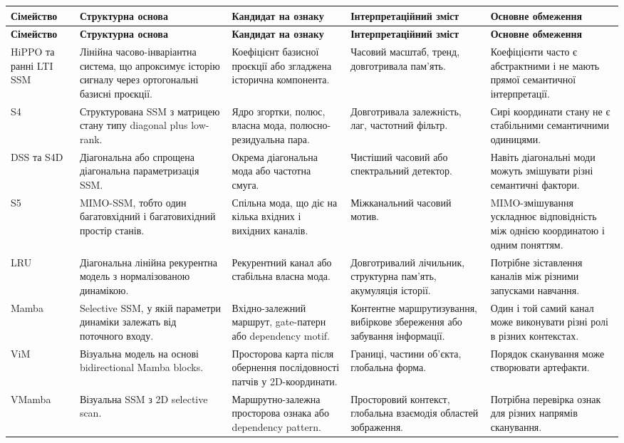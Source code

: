 \documentclass[12pt,a4paper]{article}
\begin{document}
\begin{longtable}{p{2.6cm} p{3.6cm} p{3.4cm} p{3.2cm} p{3.4cm}}
\toprule
\textbf{Сімейство}
&
\textbf{Структурна основа}
&
\textbf{Кандидат на ознаку}
&
\textbf{Інтерпретаційний зміст}
&
\textbf{Основне обмеження}
\\
\midrule
\endfirsthead

\toprule
\textbf{Сімейство}
&
\textbf{Структурна основа}
&
\textbf{Кандидат на ознаку}
&
\textbf{Інтерпретаційний зміст}
&
\textbf{Основне обмеження}
\\
\midrule
\endhead

HiPPO та ранні LTI SSM
&
Лінійна часово-інваріантна система, що апроксимує історію сигналу
через ортогональні базисні проєкції.
&
Коефіцієнт базисної проєкції або згладжена історична компонента.
&
Часовий масштаб, тренд, довготривала пам'ять.
&
Коефіцієнти часто є абстрактними і не мають прямої семантичної
інтерпретації.
\\

S4
&
Структурована SSM з матрицею стану типу diagonal plus low-rank.
&
Ядро згортки, полюс, власна мода, полюсно-резидуальна пара.
&
Довготривала залежність, лаг, частотний фільтр.
&
Сирі координати стану не є стабільними семантичними одиницями.
\\

DSS та S4D
&
Діагональна або спрощена діагональна параметризація SSM.
&
Окрема діагональна мода або частотна смуга.
&
Чистіший часовий або спектральний детектор.
&
Навіть діагональні моди можуть змішувати різні семантичні фактори.
\\

S5
&
MIMO-SSM, тобто один багатовхідний і багатовихідний простір станів.
&
Спільна мода, що діє на кілька вхідних і вихідних каналів.
&
Міжканальний часовий мотив.
&
MIMO-змішування ускладнює відповідність між однією координатою і
одним поняттям.
\\

LRU
&
Діагональна лінійна рекурентна модель з нормалізованою динамікою.
&
Рекурентний канал або стабільна власна мода.
&
Довготривалий лічильник, структурна пам'ять, акумуляція історії.
&
Потрібне зіставлення каналів між різними запусками навчання.
\\

Mamba
&
Selective SSM, у якій параметри динаміки залежать від поточного входу.
&
Вхідно-залежний маршрут, gate-патерн або dependency motif.
&
Контентне маршрутизування, вибіркове збереження або забування
інформації.
&
Один і той самий канал може виконувати різні ролі в різних контекстах.
\\

ViM
&
Візуальна модель на основі bidirectional Mamba blocks.
&
Просторова карта після обернення послідовності патчів у 2D-координати.
&
Границі, частини об'єкта, глобальна форма.
&
Порядок сканування може створювати артефакти.
\\

VMamba
&
Візуальна SSM з 2D selective scan.
&
Маршрутно-залежна просторова ознака або dependency pattern.
&
Просторовий контекст, глобальна взаємодія областей зображення.
&
Потрібна перевірка ознак для різних напрямів сканування.
\\
\bottomrule
\end{longtable}
\end{document}
